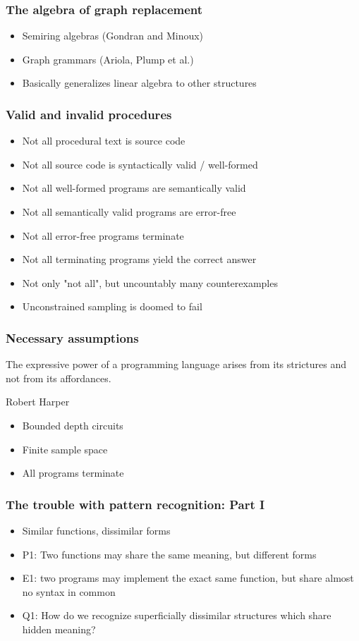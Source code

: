 \documentclass{beamer}
\begin{document}
  \begin{frame}
    \frametitle{The algebra of graph replacement}
    \begin{itemize}
      \item Semiring algebras (Gondran and Minoux)
      \item Graph grammars (Ariola, Plump et al.)
      \item Basically generalizes linear algebra to other structures
    \end{itemize}
  \end{frame}

  \begin{frame}
    \frametitle{Valid and invalid procedures}
    \begin{itemize}
      \item Not all procedural text is source code
      \item Not all source code is syntactically valid / well-formed
      \item Not all well-formed programs are semantically valid
      \item Not all semantically valid programs are error-free
      \item Not all error-free programs terminate
      \item Not all terminating programs yield the correct answer
      \item Not only "not all", but uncountably many counterexamples
      \item Unconstrained sampling is doomed to fail
    \end{itemize}
  \end{frame}

  \begin{frame}
    \frametitle{Necessary assumptions}
    \setlength{\epigraphwidth}{0.5\textwidth}
    \epigraph{The expressive power of a programming language arises from its strictures and not from its affordances.}{Robert Harper}
    \begin{itemize}
      \item Bounded depth circuits
      \item Finite sample space
      \item All programs terminate
    \end{itemize}
  \end{frame}

  \begin{frame}
    \frametitle{The trouble with pattern recognition: Part I}
    \begin{itemize}
      \item Similar functions, dissimilar forms
      \item P1: Two functions may share the same meaning, but different forms
      \item E1: two programs may implement the exact same function, but share almost no syntax in common
      \item Q1: How do we recognize superficially dissimilar structures which share hidden meaning?
    \end{itemize}
  \end{frame}
\end{document}
